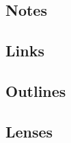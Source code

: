 \documentclass{article}
\begin{document}
\subsection{Notes}\label{gelement:notes}

\subsection{Links}\label{gelement:links}

\subsection{Outlines}\label{gelement:outlines}

\subsection{Lenses}\label{gelement:lenses}
\end{document}
